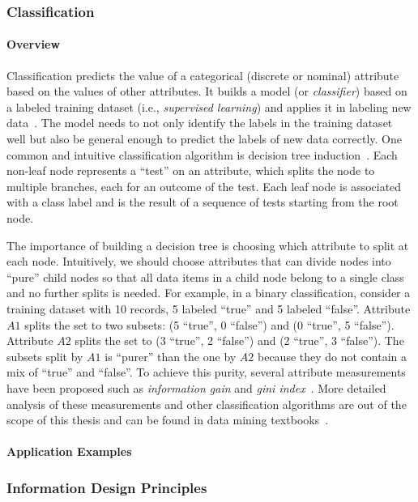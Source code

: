 \subsubsection{Classification}
\paragraph{Overview}
Classification predicts the value of a categorical (discrete or nominal) attribute based on the values of other attributes. It builds a model (or \emph{classifier}) based on a labeled training dataset (i.e., \emph{supervised learning}) and applies it in labeling new data~\cite{Han2011}. The model needs to not only identify the labels in the training dataset well but also be general enough to predict the labels of new data correctly. One common and intuitive classification algorithm is decision tree induction~\cite{Quinlan1986}. Each non-leaf node represents a ``test'' on an attribute, which splits the node to multiple branches, each for an outcome of the test. Each leaf node is associated with a class label and is the result of a sequence of tests starting from the root node.

The importance of building a decision tree is choosing which attribute to split at each node. Intuitively, we should choose attributes that can divide nodes into ``pure'' child nodes so that all data items in a child node belong to a single class and no further splits is needed. For example, in a binary classification, consider a training dataset with 10 records, 5 labeled ``true'' and 5 labeled ``false''. Attribute $A1$ splits the set to two subsets: (5 ``true'', 0 ``false'') and (0 ``true'', 5 ``false''). Attribute $A2$ splits the set to (3 ``true'', 2 ``false'') and (2 ``true'', 3 ``false''). The subsets split by $A1$ is ``purer'' than the one by $A2$ because they do not contain a mix of ``true'' and ``false''. To achieve this purity, several attribute measurements have been proposed such as \emph{information gain} and \emph{gini index}~\cite{Tan2006}. More detailed analysis of these measurements and other classification algorithms are out of the scope of this thesis and can be found in data mining textbooks~\cite{Tan2006,Han2011}.

\paragraph{Application Examples}

\subsubsection{Information Design Principles}
\label{sub:lr-design}

